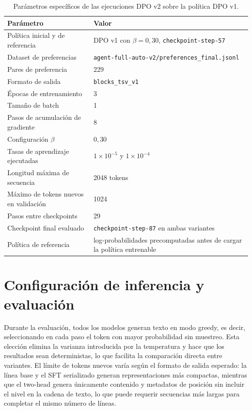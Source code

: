 \begin{table}[htbp]
\centering
\caption{Parámetros específicos de las ejecuciones DPO v2 sobre la política DPO v1.}
\label{tab:AnexoA_dpo_v2_training}
\begin{tabularx}{\textwidth}{p{}X}
\toprule
\textbf{Parámetro} & \textbf{Valor} \\
\midrule
Política inicial y de referencia & DPO v1 con \(\beta=0{,}30\), \texttt{checkpoint-step-57} \\
Dataset de preferencias & \texttt{agent-full-auto-v2/preferences\_final.jsonl} \\
Pares de preferencia & 229 \\
Formato de salida & \texttt{blocks\_tsv\_v1} \\
Épocas de entrenamiento & 3 \\
Tamaño de batch & 1 \\
Pasos de acumulación de gradiente & 8 \\
Configuración \(\beta\) & \(0{,}30\) \\
Tasas de aprendizaje ejecutadas & \(1\times10^{-5}\) y \(1\times10^{-4}\) \\
Longitud máxima de secuencia & 2048 tokens \\
Máximo de tokens nuevos en validación & 1024 \\
Pasos entre checkpoints & 29 \\
Checkpoint final evaluado & \texttt{checkpoint-step-87} en ambas variantes \\
Política de referencia & log-probabilidades precomputadas antes de cargar la política entrenable \\
\bottomrule
\end{tabularx}
\end{table}

\section{Configuración de inferencia y evaluación}

Durante la evaluación, todos los modelos generan texto en modo greedy, es decir, seleccionando en cada paso el token con mayor probabilidad sin muestreo. Esta elección
elimina la varianza introducida por la temperatura y hace que los resultados sean deterministas, lo que facilita la comparación directa entre variantes. El límite de tokens
nuevos varía según el formato de salida esperado: la línea base y el SFT serializado generan representaciones más compactas, mientras que el two-head genera únicamente contenido
y metadatos de posición sin incluir el nivel en la cadena de texto, lo que puede requerir secuencias más largas para completar el mismo número de líneas.


